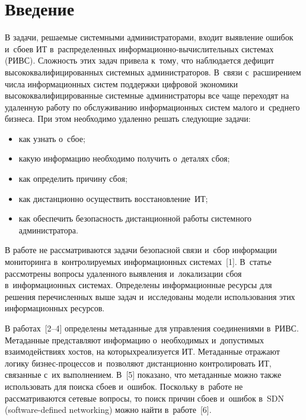   
 
 



\thispagestyle{headings}

\begin{multicols}{2}

\label{st\stat}
  

\section{Введение} 
  
  В задачи, решаемые системными администраторами, входит выявление ошибок 
и~сбоев ИТ в~распределенных ин\-фор\-ма\-ци\-он\-но-вы\-чис\-ли\-те\-ль\-ных 
сис\-те\-мах (\mbox{РИВС}). Слож\-ность этих задач привела к~тому, что 
наблюдается дефицит высококвалифицированных системных администраторов.\linebreak 
В~связи с~расширением числа информационных сис\-тем поддержки цифровой 
экономики высококвалифицированные системные администраторы все чаще 
переходят на удаленную работу по обслуживанию информационных систем 
малого и~среднего бизнеса. При этом необходимо удаленно решать следующие 
задачи:
  \begin{itemize}
\item как узнать о~сбое;
\item какую информацию необходимо получить о~деталях сбоя;
\item как определить причину сбоя;
\item как дистанционно осуществить восстановление~ИТ;
\item как обеспечить безопасность дистанционной работы системного 
администратора.
  \end{itemize}
  
  В работе не рассматриваются задачи безопас\-ной связи и~сбор информации 
мониторинга в~контролируемых информационных системах~[1]. В~\mbox{статье} 
рассмотрены вопросы удаленного выявления и~локализации сбоя 
в~информационных системах. Определены информационные ресурсы для 
решения перечисленных выше задач и~исследованы модели использования этих 
информационных ресурсов. 
  
  В работах~[2--4] определены метаданные для управления соединениями 
в~РИВС. Метаданные представляют информацию о~необходимых и~до\-пус\-ти\-мых 
взаимодействиях хостов, на которых\linebreak реализуется ИТ. Метаданные отражают 
логику биз\-нес-про\-цес\-сов и~позволяют дистанционно контролировать ИТ, 
связанные с~их выполнением. В~[5] показано, что метаданные можно также 
использовать для поиска сбоев и~ошибок. Поскольку в~работе не 
рассматриваются сетевые вопросы, то поиск причин сбоев и~ошибок в~SDN 
(software-defined networking)
можно найти в~работе~[6]. 
  

\end{multicols}
